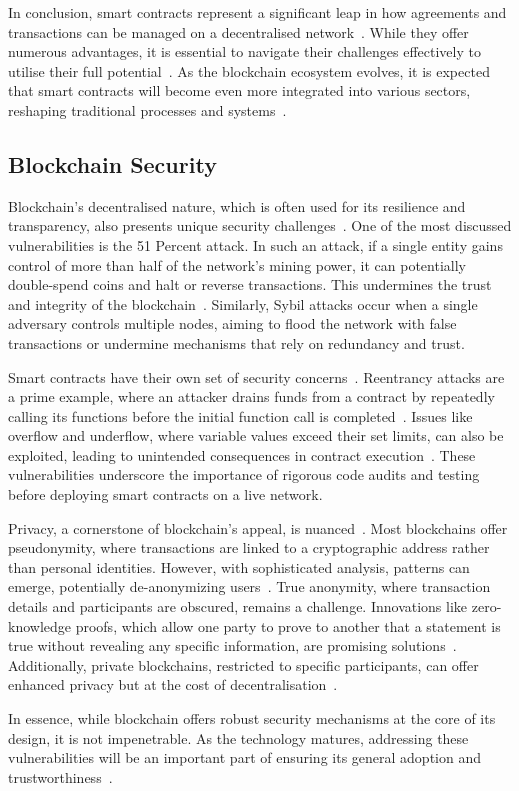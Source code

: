 In conclusion, smart contracts represent a significant leap in how agreements and transactions can be managed on a decentralised network~\cite{.2019}. While they offer numerous advantages, it is essential to navigate their challenges effectively to utilise their full potential~\cite{.2019}. As the blockchain ecosystem evolves, it is expected that smart contracts will become even more integrated into various sectors, reshaping traditional processes and systems~\cite{.2019}.

\subsection{Blockchain Security}
Blockchain's decentralised nature, which is often used for its resilience and transparency, also presents unique security challenges~\cite{Leng.2022}. One of the most discussed vulnerabilities is the 51 Percent attack. In such an attack, if a single entity gains control of more than half of the network's mining power, it can potentially double-spend coins and halt or reverse transactions. This undermines the trust and integrity of the blockchain~\cite{Singh.2021}. Similarly, Sybil attacks occur when a single adversary controls multiple nodes, aiming to flood the network with false transactions or undermine mechanisms that rely on redundancy and trust.

Smart contracts have their own set of security concerns~\cite{Alkhalifah.2021}. Reentrancy attacks are a prime example, where an attacker drains funds from a contract by repeatedly calling its functions before the initial function call is completed~\cite{Alkhalifah.2021}. Issues like overflow and underflow, where variable values exceed their set limits, can also be exploited, leading to unintended consequences in contract execution~\cite{Guo.2022}. These vulnerabilities underscore the importance of rigorous code audits and testing before deploying smart contracts on a live network.

Privacy, a cornerstone of blockchain's appeal, is nuanced~\cite{Kus.2022}. Most blockchains offer pseudonymity, where transactions are linked to a cryptographic address rather than personal identities. However, with sophisticated analysis, patterns can emerge, potentially de-anonymizing users~\cite{Kus.2022}. True anonymity, where transaction details and participants are obscured, remains a challenge. Innovations like zero-knowledge proofs, which allow one party to prove to another that a statement is true without revealing any specific information, are promising solutions~\cite{Deng.2021}. Additionally, private blockchains, restricted to specific participants, can offer enhanced privacy but at the cost of decentralisation~\cite{Deng.2021}.

In essence, while blockchain offers robust security mechanisms at the core of its design, it is not impenetrable. As the technology matures, addressing these vulnerabilities will be an important part of ensuring its general adoption and trustworthiness~\cite{Singh.2021}.
